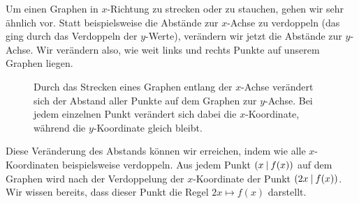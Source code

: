 \documentclass[../../main.tex]{subfiles}
\begin{document}
Um einen Graphen in $x$-Richtung zu strecken oder zu stauchen, gehen wir sehr ähnlich vor. Statt beispielsweise die Abstände zur $x$-Achse zu verdoppeln (das ging durch das Verdoppeln der $y$-Werte), verändern wir jetzt die Abstände zur $y$-Achse. Wir verändern also, wie weit links und rechts Punkte auf unserem Graphen liegen.

\begin{figure}[ht]
    \centering
        \caption{Durch das Strecken eines Graphen entlang der $x$-Achse verändert sich der Abstand aller Punkte auf dem Graphen zur $y$-Achse. Bei jedem einzelnen Punkt verändert sich dabei die $x$-Koordinate, während die $y$-Koordinate gleich bleibt.}
\end{figure}

Diese Veränderung des Abstands können wir erreichen, indem wie alle $x$-Koordinaten beispielsweise verdoppeln. Aus jedem Punkt $\left(x \:\middle|\: f(x)\right)$ auf dem Graphen wird nach der Verdoppelung der $x$-Koordinate der Punkt $\left(2x \:\middle|\: f(x)\right)$. Wir wissen bereits, dass dieser Punkt die Regel $2x\mapsto f(x)$ darstellt.
\end{document}
